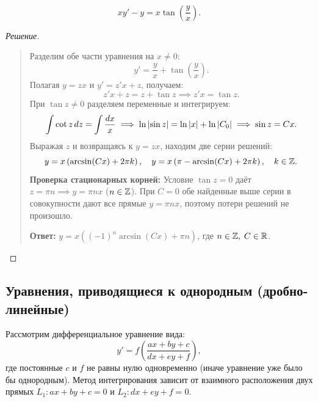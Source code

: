 \begin{example} ~
    \begin{equation} \label{eq:l5_ex1}
        x y' - y = x \tan\left(\frac{y}{x}\right). \tag{7}
    \end{equation}

    \begin{proof}[Решение]~\\
        \begin{quote}
            Разделим обе части уравнения на $x \neq 0$:
            \[
                y' = \frac{y}{x} + \tan\left(\frac{y}{x}\right).
            \]
            Полагая $y = z x$ и $y' = z' x + z$, получаем:
            \[
                z' x + z = z + \tan z \implies z' x = \tan z.
            \]
            При $\tan z \neq 0$ разделяем переменные и интегрируем:
            \[
                \int \cot z \, dz = \int \frac{dx}{x} \implies
                \ln \left| \sin z \right| = \ln \left| x \right| + \ln \left| C_0 \right| \implies
                \sin z = C x.
            \]
            Выражая $z$ и возвращаясь к $y = z x$, находим две серии решений:
            \[
                y = x \left(\arcsin(C x) + 2\pi k\right), \quad
                y = x \left(\pi - \arcsin(C x) + 2\pi k\right), \quad k \in \mathbb{Z}.
            \]
            \textbf{Проверка стационарных корней:} Условие $\tan z = 0$ даёт
            $z = \pi n \implies y = \pi n x$ ($n \in \mathbb{Z}$). При $C = 0$ обе
            найденные выше серии в совокупности дают все прямые $y = \pi n x$,
            поэтому потери решений не произошло.

            \textbf{Ответ:} $y = x \left((-1)^n \arcsin(C x) + \pi n\right)$,
            где $n \in \mathbb{Z}, \; C \in \mathbb{R}$.
        \end{quote}
    \end{proof}
\end{example}

\subsection{Уравнения, приводящиеся к однородным (дробно-линейные)}

Рассмотрим дифференциальное уравнение вида:
\begin{equation} \label{eq:l5_red_hom}
    y' = f\left(\frac{a x + b y + c}{d x + e y + f}\right), \tag{8}
\end{equation}
где постоянные $c$ и $f$ не равны нулю одновременно (иначе уравнение уже было
бы однородным). Метод интегрирования зависит от взаимного расположения двух
прямых $L_1: a x + b y + c = 0$ и $L_2: d x + e y + f = 0$.

